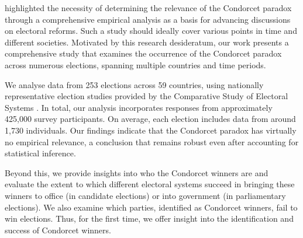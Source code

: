 \documentclass[12pt]{scrartcl}
\newcommand{\nbelections}{253 }
\newcommand{\nbcountries}{59 }
\begin{document}
\citet[Ch.~10.2]{Sen2017} highlighted the necessity of determining the relevance of the Condorcet paradox through a comprehensive empirical analysis as a basis for advancing discussions on electoral reforms. Such a study should ideally cover various points in time and different societies. Motivated by this research desideratum, our work presents a comprehensive study that examines the occurrence of the Condorcet paradox across numerous elections, spanning multiple countries and time periods. 

We analyse data from \nbelections elections across \nbcountries countries, using nationally representative election studies provided by the Comparative Study of Electoral Systems \citep{CSES2020}. In total, our analysis incorporates responses from approximately 425,000 survey participants. On average, each election includes data from around 1,730 individuals. Our findings indicate that the Condorcet paradox has virtually no empirical relevance, a conclusion that remains robust even after accounting for statistical inference. 

Beyond this, we provide insights into who the Condorcet winners are and evaluate the extent to which different electoral systems succeed in bringing these winners to office (in candidate elections) or into government (in parliamentary elections). We also examine which parties, identified as Condorcet winners, fail to win elections. Thus, for the first time, we offer insight into the identification and success of Condorcet winners.
\end{document}
